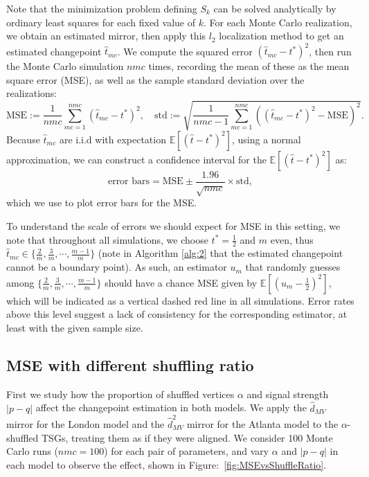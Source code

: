 \documentclass[12pt]{article}
\newcommand{\EE}{\mathbb{E}}
\theoremstyle{definition}
\begin{document}
Note that the minimization problem defining $S_k$ can be solved analytically by ordinary least squares for each fixed value of $k$. For each Monte Carlo realization, we obtain an estimated mirror, then apply this $l_2$ localization method to get an estimated changepoint $\hat{t}_{mc}$. We compute the squared error $(\hat{t}_{mc} - t^*)^2$, then run the Monte Carlo simulation $nmc$ times, recording the mean of these as the mean square error (MSE), as well as the sample standard deviation over the realizations: 
$$
\text{MSE} := \frac{1}{nmc} \sum_{mc=1}^{nmc} \left(\hat{t}_{mc} - t^*\right)^2, \quad 
\text{std} := \sqrt{\frac{1}{nmc-1} \sum_{mc=1}^{nmc} \left( \left(\hat{t}_{mc} - t^*\right)^2 - \text{MSE} \right)^2}.
$$
Because $\hat{t}_{mc}$ are i.i.d with expectation $\EE[(\hat{t} - t^*)^2]$, using a normal approximation, we can construct a confidence interval for the $\EE[(\hat{t} - t^*)^2]$ as:$$
\text{error bars} = \text{MSE} \pm \frac{1.96}{\sqrt{nmc}} \times \text{std},
$$ which we use to plot error bars for the MSE. 

To understand the scale of errors we should expect for MSE in this setting, we note that throughout all simulations, we choose $t^*= \frac{1}{2}$ and $m$ even, thus $\hat{t}_{mc} \in \{\frac{2}{m},\frac{3}{m}, \cdots,\frac{m-1}{m}\}$ (note in Algorithm \ref{alg:2} that the estimated changepoint cannot be a boundary point). As such, an estimator $u_m$ that randomly guesses among $\{\frac{2}{m},\frac{3}{m}, \cdots,\frac{m-1}{m}\}$ should have a chance MSE given by $\EE[ (u_m - \frac{1}{2})^2 ]$, which will be indicated as a vertical dashed red line in all simulations. Error rates above this level suggest a lack of consistency for the corresponding estimator, at least with the given sample size.


\subsection{MSE with different shuffling ratio}\label{Simulation_MSE}
First we study how the proportion of shuffled vertices $\alpha$ and signal strength $|p-q|$ affect the changepoint estimation in both models. 
We apply the $\hat{d}_{MV}$ mirror for the London model and the $\hat{d}^2_{MV}$ mirror for the Atlanta model to the $\alpha$-shuffled TSGs, treating them as if they were aligned. We consider 100 Monte Carlo runs ($nmc=100$) for each pair of parameters, and vary $\alpha$ and $|p-q|$ in each model to observe the effect, shown in Figure:~\ref{fig:MSEvsShuffleRatio}. 
\end{document}
